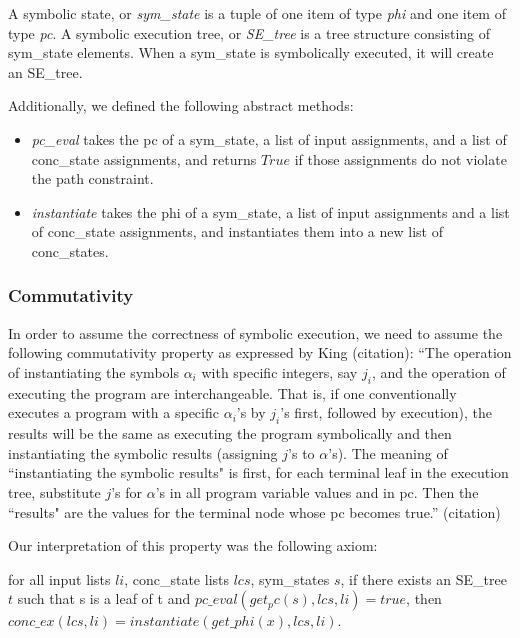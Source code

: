 A symbolic state, or \textit{sym\_state} is a tuple of one item of type \textit{phi} and one item of type \textit{pc}.
A symbolic execution tree, or \textit{SE\_tree} is a tree structure consisting of sym\_state elements. 
When a sym\_state is symbolically executed, it will create an SE\_tree.

Additionally, we defined the following abstract methods:
\begin{itemize}
\item \textit{pc\_eval} takes the pc of a sym\_state, a list of input assignments, and a list of conc\_state assignments, and returns $True$ if those assignments do not violate the path constraint.
\item \textit{instantiate} takes the phi of a sym\_state, a list of input assignments and a list of conc\_state assignments, and instantiates them into a new list of conc\_states.
\end{itemize}


\subsubsection{Commutativity}
In order to assume the correctness of symbolic execution, we need to assume the following commutativity property as expressed by King (citation):
``The operation of instantiating the symbols
{$\alpha_i$} with specific integers, say {$j_i$}, and the operation of
executing the program are interchangeable. That is, if
one conventionally executes a program with a specific
$\alpha_i$'s by
$j_i$'s first, followed by execution), the results will be the
same as executing the program symbolically and then
instantiating the symbolic results (assigning $j$'s to $\alpha$'s).
The meaning of ``instantiating the symbolic results" is
first, for each terminal leaf in the execution tree, substitute
$j$'s for $\alpha$'s in all program variable values and in
pc. Then the ``results" are the values for the terminal 
node whose pc becomes true.'' (citation)


Our interpretation of this property was the following axiom:
\begin{axiom}
for all input lists $li$, conc\_state lists $lcs$, sym\_states $s$,
if there exists an SE\_tree $t$ such that
s is a leaf of t and
$pc\_eval (get_pc(s), lcs, li) = true$,
then
$conc\_ex(lcs, li) = instantiate (get\_phi (x), lcs, li)$.
\end{axiom}

